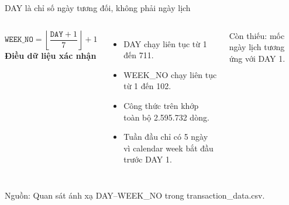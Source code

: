 \documentclass[aspectratio=169,11pt]{beamer}
\newcommand{\src}[1]{\par\vfill{\tiny\color{gray}Nguồn: #1}}
\begin{document}
\begin{frame}{DAY là chỉ số ngày tương đối, không phải ngày lịch}
\begin{columns}[T]
\centering
{}
\vspace{.45cm}
\[
\texttt{WEEK\_NO}=\left\lfloor\frac{\texttt{DAY}+1}{7}\right\rfloor+1
\]
\textbf{Điều dữ liệu xác nhận}
\begin{itemize}
\item DAY chạy liên tục từ 1 đến 711.
\item WEEK\_NO chạy liên tục từ 1 đến 102.
\item Công thức trên khớp toàn bộ 2.595.732 dòng.
\item Tuần đầu chỉ có 5 ngày vì calendar week bắt đầu trước DAY 1.
\end{itemize}
\medskip
\alert{Còn thiếu:} mốc ngày lịch tương ứng với DAY 1.
\end{columns}
\src{Quan sát ánh xạ DAY--WEEK\_NO trong transaction\_data.csv.}
\end{frame}
\end{document}
